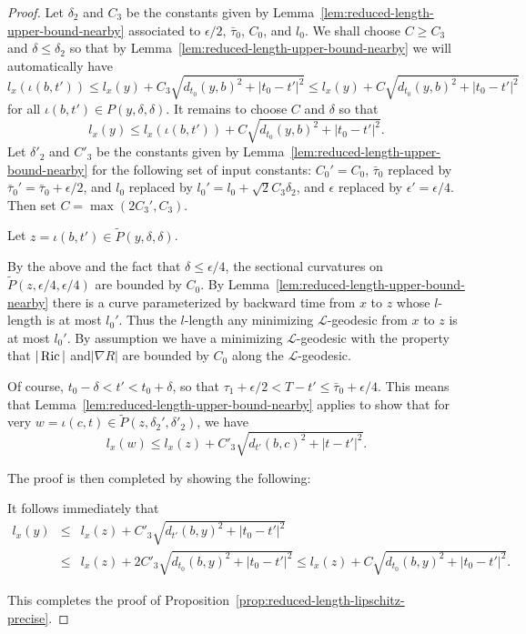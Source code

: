 \begin{proof}
\sketch
{}
Let $\delta_2$ and $C_3$ be the constants given by
Lemma~\ref{lem:reduced-length-upper-bound-nearby} associated to $\epsilon/2$, $\bar\tau_0$, $C_0$,
and $l_0$. We shall choose $C\ge C_3$ and $\delta\le \delta_2$ so
that by Lemma~\ref{lem:reduced-length-upper-bound-nearby} we will automatically have
$$l_x(\iota(b,t'))\le l_x(y)+C_3\sqrt{d_{t_0}(y,b)^2+|t_0-t'|^2}
\le l_x(y)+C\sqrt{d_{t_0}(y,b)^2+|t_0-t'|^2}$$ for all
$\iota(b,t')\in P(y,\delta,\delta)$. It remains to choose $C$ and
$\delta$ so that
$$l_x(y)\le l_x(\iota(b,t'))+C\sqrt{d_{t_0}(y,b)^2+|t_0-t'|^2}.$$
 Let
$\delta'_2$ and $ C'_3$ be the constants given by
Lemma~\ref{lem:reduced-length-upper-bound-nearby} for the following set of input constants:
$C_0'=C_0$, $\bar\tau_0$ replaced by
$\bar\tau_0'=\bar\tau_0+\epsilon/2$, and $l_0$ replaced by
$l_0'=l_0+\sqrt{2}C_3\delta_2$, and $\epsilon$ replaced by
$\epsilon'=\epsilon/4$. Then set $C=\max(2C_3',C_3)$.

Let $z=\iota(b,t')\in \widetilde P(y,\delta,\delta)$.



 By
the above and the fact that $ \delta\le\epsilon/4$, the sectional
curvatures on $\widetilde P(z,\epsilon/4,\epsilon/4)$ are bounded by
$C_0$. By Lemma~\ref{lem:reduced-length-upper-bound-nearby} there is a curve parameterized by
backward time from $x$ to $z$ whose $l$-length is at most $l_0'$.
Thus the $l$-length any minimizing ${\mathcal L}$-geodesic from $x$
to $z$ is at most $l_0'$. By assumption we have a minimizing
${\mathcal L}$-geodesic with the property that  $|\operatorname{Ric}|$
and$|\nabla R|$ are bounded by $C_0$ along the ${\mathcal
L}$-geodesic.

Of course, $t_0-\delta<t'<t_0+\delta$, so that
$\tau_1+\epsilon/2<T-t'\le \bar\tau_0+\epsilon/4$. This means that
Lemma~\ref{lem:reduced-length-upper-bound-nearby} applies to show that for very $w=\iota(c,t)\in
\widetilde P(z,\delta_2',\delta'_2)$,  we have
$$l_x(w)\le l_x(z)+C'_3\sqrt{d_{t'}(b,c)^2+|t-t'|^2}.$$


The proof is then completed by showing the following:



It follows immediately that \begin{eqnarray*} l_x(y) & \le &
l_x(z)+C'_3\sqrt{d_{t'}(b,y)^2+|t_0-t'|^2} \\ & \le & l_x(z)+2
C'_3\sqrt{d_{t_0}(b,y)^2+|t_0-t'|^2}\le
l_x(z)+C\sqrt{d_{t_0}(b,y)^2+|t_0-t'|^2}.
\end{eqnarray*}

This completes the proof of Proposition~\ref{prop:reduced-length-lipschitz-precise}.
\end{proof}

